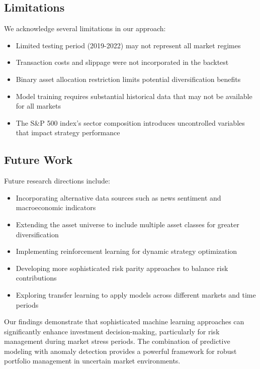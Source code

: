 \documentclass[13pt]{article}
\begin{document}
\subsection{Limitations}
We acknowledge several limitations in our approach:

\begin{itemize}
	\item Limited testing period (2019-2022) may not represent all market regimes
	\item Transaction costs and slippage were not incorporated in the backtest
	\item Binary asset allocation restriction limits potential diversification benefits
	\item Model training requires substantial historical data that may not be available for all markets
	\item The S\&P 500 index's sector composition introduces uncontrolled variables that impact strategy performance
\end{itemize}

\subsection{Future Work}
Future research directions include:

\begin{itemize}
	\item Incorporating alternative data sources such as news sentiment and macroeconomic indicators
	\item Extending the asset universe to include multiple asset classes for greater diversification
	\item Implementing reinforcement learning for dynamic strategy optimization
	\item Developing more sophisticated risk parity approaches to balance risk contributions
	\item Exploring transfer learning to apply models across different markets and time periods
\end{itemize}

Our findings demonstrate that sophisticated machine learning approaches can significantly enhance investment decision-making, particularly for risk management during market stress periods. The combination of predictive modeling with anomaly detection provides a powerful framework for robust portfolio management in uncertain market environments.
\end{document}
